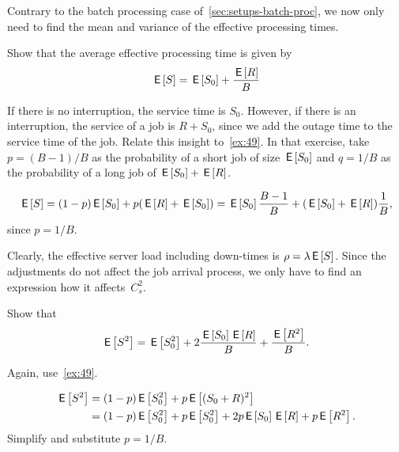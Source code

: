 Contrary to the batch processing case of~\cref{sec:setups-batch-proc}, we now only need to find the mean and variance of the effective processing times.
\begin{exercise}
Show that the average effective processing time is given by
\begin{equation} \label{eq:88}
 \,\mathsf{E}\left[S\right] = \,\mathsf{E}\left[S_0\right] + \frac{\,\mathsf{E}\left[R\right]}B
\end{equation}

\begin{hint}
  If there is no interruption, the service time is $S_0$.
  However, if there is an interruption, the service of a job is $R + S_0$, since we add the outage time to the service time of the job.
  Relate this insight to~\cref{ex:49}.
  In that exercise, take $p=(B-1)/B$ as the probability of a short job of size $\,\mathsf{E}\left[S_0\right]$ and $q=1/B$ as the probability of a long job of $\,\mathsf{E}\left[S_0\right] + \,\mathsf{E}\left[R\right]$.
\end{hint}
\begin{solution}
 \begin{equation*}
 \,\mathsf{E}\left[S\right] = (1-p)\,\mathsf{E}\left[S_0\right] + p (\,\mathsf{E}\left[R\right] + \,\mathsf{E}\left[S_0\right]) = \,\mathsf{E}\left[S_0\right] \frac{B-1}B + (\,\mathsf{E}\left[S_0\right] + \,\mathsf{E}\left[R\right]) \frac 1B,
 \end{equation*}
since $p=1/B$. 
\end{solution}
\end{exercise}

Clearly, the effective server load including down-times is $\rho = \lambda \,\mathsf{E}\left[S\right]$.
Since the adjustments do not affect the job arrival process, we only have to find an expression how it affects~$C_s^2$.

\begin{extra}
 Show that
 \begin{equation*}
 \,\mathsf{E}\left[S^2\right] = \,\mathsf{E}\left[S_0^2\right] + 2\frac{\,\mathsf{E}\left[S_0\right]\,\mathsf{E}\left[R\right]} B + \frac{\,\mathsf{E}\left[R^2\right]}B.
 \end{equation*}
\begin{hint}
  Again, use~\cref{ex:49}.
\end{hint}
\begin{solution}
 \begin{align*}
 \,\mathsf{E}\left[S^2\right] 
&= (1-p) \,\mathsf{E}\left[S_0^2\right] + p \,\mathsf{E}\left[(S_0+R)^2\right]\\
&= (1-p) \,\mathsf{E}\left[S_0^2\right] + p \,\mathsf{E}\left[S_0^2\right] + 2 p \,\mathsf{E}\left[S_0\right] \,\mathsf{E}\left[R\right] + p \,\mathsf{E}\left[R^2\right]. 
 \end{align*}
 Simplify and substitute $p=1/B$. 
\end{solution}
\end{extra}

